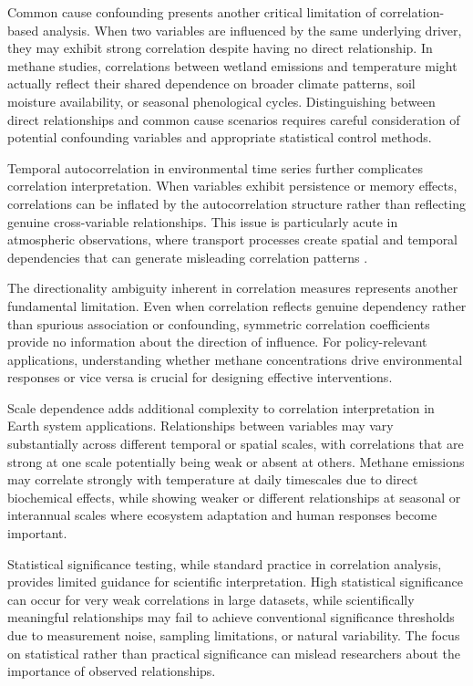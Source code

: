 Common cause confounding presents another critical limitation of correlation-based analysis. When two variables are influenced by the same underlying driver, they may exhibit strong correlation despite having no direct relationship. In methane studies, correlations between wetland emissions and temperature might actually reflect their shared dependence on broader climate patterns, soil moisture availability, or seasonal phenological cycles. Distinguishing between direct relationships and common cause scenarios requires careful consideration of potential confounding variables and appropriate statistical control methods.

Temporal autocorrelation in environmental time series further complicates correlation interpretation. When variables exhibit persistence or memory effects, correlations can be inflated by the autocorrelation structure rather than reflecting genuine cross-variable relationships. This issue is particularly acute in atmospheric observations, where transport processes create spatial and temporal dependencies that can generate misleading correlation patterns \cite{attanasio2013}.

The directionality ambiguity inherent in correlation measures represents another fundamental limitation. Even when correlation reflects genuine dependency rather than spurious association or confounding, symmetric correlation coefficients provide no information about the direction of influence. For policy-relevant applications, understanding whether methane concentrations drive environmental responses or vice versa is crucial for designing effective interventions.

Scale dependence adds additional complexity to correlation interpretation in Earth system applications. Relationships between variables may vary substantially across different temporal or spatial scales, with correlations that are strong at one scale potentially being weak or absent at others. Methane emissions may correlate strongly with temperature at daily timescales due to direct biochemical effects, while showing weaker or different relationships at seasonal or interannual scales where ecosystem adaptation and human responses become important.

Statistical significance testing, while standard practice in correlation analysis, provides limited guidance for scientific interpretation. High statistical significance can occur for very weak correlations in large datasets, while scientifically meaningful relationships may fail to achieve conventional significance thresholds due to measurement noise, sampling limitations, or natural variability. The focus on statistical rather than practical significance can mislead researchers about the importance of observed relationships.




